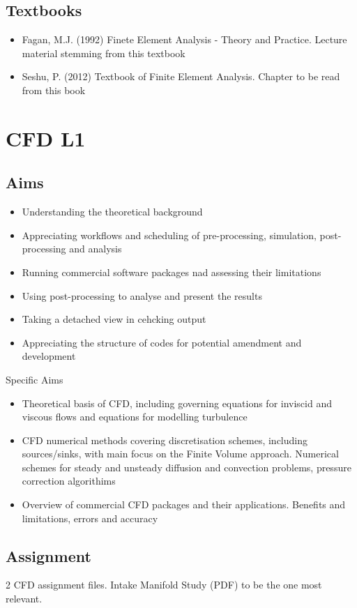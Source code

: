 \subsection{Textbooks}
\begin{itemize}
	\item Fagan, M.J. (1992) Finete Element Analysis - Theory and Practice. Lecture material stemming from this textbook
	\item Seshu, P. (2012) Textbook of Finite Element Analysis. Chapter to be read from this book
\end{itemize}
\section{CFD L1}
\subsection{Aims}
\begin{itemize}
	\item Understanding the theoretical background
	\item Appreciating workflows and scheduling of pre-processing, simulation, post-processing and analysis
	\item Running commercial software packages nad assessing their limitations
	\item Using post-processing to analyse and present the results
	\item Taking a detached view in cehcking output
	\item Appreciating the structure of codes for potential amendment and development
\end{itemize}
Specific Aims
\begin{itemize}
	\item Theoretical basis of CFD, including governing equations for inviscid and viscous flows and equations for modelling turbulence
	\item CFD numerical methods covering discretisation schemes, including sources/sinks, with main focus on the Finite Volume approach. Numerical schemes for steady and unsteady diffusion and convection problems, pressure correction algorithims
	\item Overview of commercial CFD packages and their applications. Benefits and limitations, errors and accuracy
\end{itemize}
\subsection{Assignment}
2 CFD assignment files. Intake Manifold Study (PDF) to be the one most relevant.

